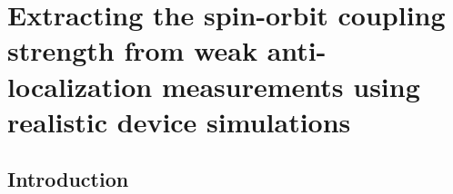 \chapter{Extracting the spin-orbit coupling strength from weak anti-localization measurements using realistic device simulations}
\label{ch:weakantilocalization}

\newpage
\noindent 
\section{Introduction}



